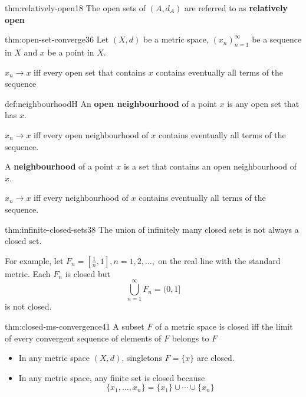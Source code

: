 \documentclass[landscape, 8pt]{extarticle}
\begin{document}
\begin{multicols}{3}
\begin{thm}{thm:relatively-open}{18}
    The open sets of $(A, d_{A})$ are referred to as \textbf{relatively open}
\end{thm}

\vspace{-5pt}
\begin{thm}[]{thm:open-set-converge}{36}
    \vspace{-5pt}
    Let $(X, d)$ be a metric space, $(x_{n})^{\infty}_{n=1}$ be a sequence in $X$ and $x$ be a point in $X$.

    $x_{n}\to x$ iff every open set that contains $x$ contains eventually all terms of the sequence
\end{thm}

\vspace{-5pt}
\begin{dfn}{def:neighbourhood}{H}
    \vspace{-5pt}
    An \textbf{open neighbourhood} of a point $x$ is any open set that has $x$. 

    $x_{n}\to x$ iff every open neighbourhood of $x$ contains eventually all terms of the sequence.

    \longrule{0.08ex}
    A \textbf{neighbourhood} of a point $x$ is a set that contains an open neighbourhood of $x$.

    $x_{n}\to x$ iff every neighbourhood of $x$ contains eventually all terms of the sequence.
\end{dfn}

\begin{rem}{thm:infinite-closed-sets}{38}
    \vspace{-5pt}
    The union of infinitely many closed sets is not always a closed set.

    For example, let $F_{n} = [\frac{1}{n}, 1], n=1,2,\dots,$ on the real line with the standard metric.
    Each $F_{n}$ is closed but
    \[\bigcup\limits_{n = 1}^{\infty}F_{n} = (0,1]\]
    is not closed.
\end{rem}

\newpage
\begin{thm}[]{thm:closed-ms-convergence}{41}
    \vspace{-5pt}
    A subset $F$ of a metric space is closed iff the limit of every convergent sequence of elements of $F$ belongs to $F$

    \longrule{0.08ex}
    \vspace{-13pt}
    \begin{itemize}[leftmargin=*]
        \item In any metric space $(X,d)$, singletons $F = \{x\}$ are closed.
        \item In any metric space, any finite set is closed because
            \[\{x_{1},\dots,x_{n}\} = \{x_{1}\}\cup \cdots \cup \{x_{n}\}\]
    \end{itemize}
\end{thm}


\end{multicols}
\end{document}
